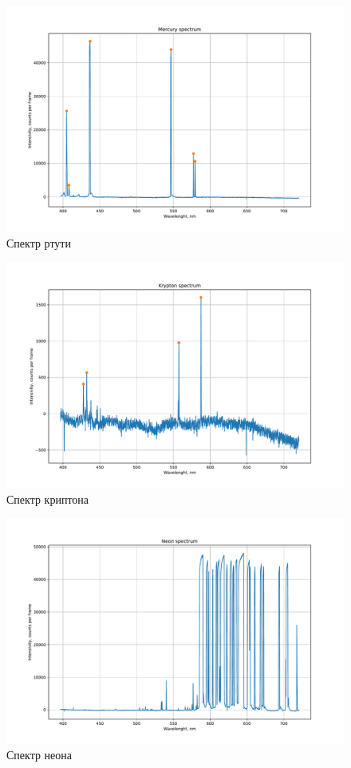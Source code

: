 \documentclass[a4paper, 12pt]{article}
\begin{document}
\begin{figure}[H]
	\centering
	\includegraphics[width=0.9\linewidth]{mercury}
	\caption{Спектр ртути}
	\label{fig:hg}
\end{figure}

\begin{figure}[H]
	\centering
	\includegraphics[width=0.9\linewidth]{krypton}
	\caption{Спектр криптона}
	\label{fig:kr}
\end{figure}

\begin{figure}[H]
	\centering
	\includegraphics[width=0.9\linewidth]{neon}
	\caption{Спектр неона}
	\label{fig:ne}
\end{figure}
\end{document}
